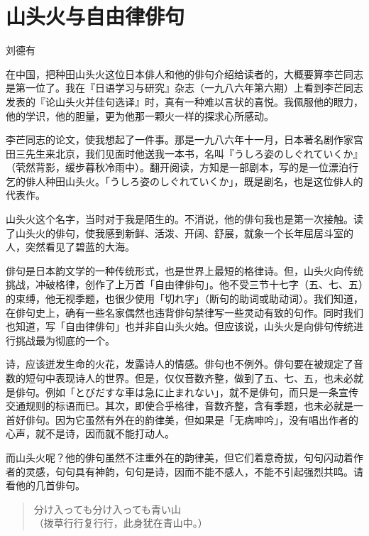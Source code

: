 \chapter{\FK 山头火与自由律俳句}
{\FS

    \hfill 刘德有

    \bigskip

    在中国，把种田山头火这位日本俳人和他的俳句介绍给读者的，大概要算李芒同志是第一位了。我在『日语学习与研究』杂志（一九八六年第六期）上看到李芒同志发表的『论山头火并佳句选译』时，真有一种难以言状的喜悦。我佩服他的眼力，他的学识，他的胆量，更为他那一颗火一样的探求心所感动。

    李芒同志的论文，使我想起了一件事。那是一九八六年十一月，日本著名剧作家宫田三先生来北京，我们见面时他送我一本书，名叫『{\FM うしろ姿のしぐれていくか}』（茕然背影，缓步暮秋冷雨中\footnotemark[1]）。翻开阅读，方知是一部剧本，写的是一位漂泊行乞的俳人种田山头火。「{\FM うしろ姿のしぐれていくか}」，既是剧名，也是这位俳人的代表作。


    山头火这个名字，当时对于我是陌生的。不消说，他的俳句我也是第一次接触。读了山头火的俳句，使我感到新鲜、活泼、开阔、舒展，就象一个长年屈居斗室的人，突然看见了碧蓝的大海。

    俳句是日本韵文学的一种传统形式，也是世界上最短的格律诗。但，山头火向传统挑战，冲破格律，创作了上万首「自由律俳句」。他不受三节十七字（五、七、五）的束缚，他无视季题，也很少使用「切れ字」（断句的助词或助动词）。我们知道，在俳句史上，确有一些名家偶然也违背俳句禁律写一些灵动有致的句作。同时我们也知道，写「自由律俳句」也并非自山头火始。但应该说，山头火是向俳句传统进行挑战最为彻底的一个。

    诗，应该迸发生命的火花，发露诗人的情感。俳句也不例外。俳句要在被规定了音数的短句中表现诗人的世界。但是，仅仅音数齐整，做到了五、七、五，也未必就是俳句。例如「{\FM とびだすな車は急に止まれない}」，就不是俳句，而只是一条宣传交通规则的标语而巳。其次，即使合乎格律，音数齐整，含有季题，也未必就是一首好俳句。因为它虽然有外在的韵律美，但如果是「无病呻吟」，没有唱出作者的心声，就不是诗，因而就不能打动人。

    而山头火呢？他的俳句虽然不注重外在的韵律美，但它们着意奇拔，句句闪动着作者的灵感，句句具有神韵，句句是诗，因而不能不感人，不能不引起强烈共鸣。请看他的几首俳句。
    \begin{quote}
        {\FM 分け入っても分け入っても青い山}\\
        （拨草行行复行行，此身犹在青山中。）


\end{quote}}
